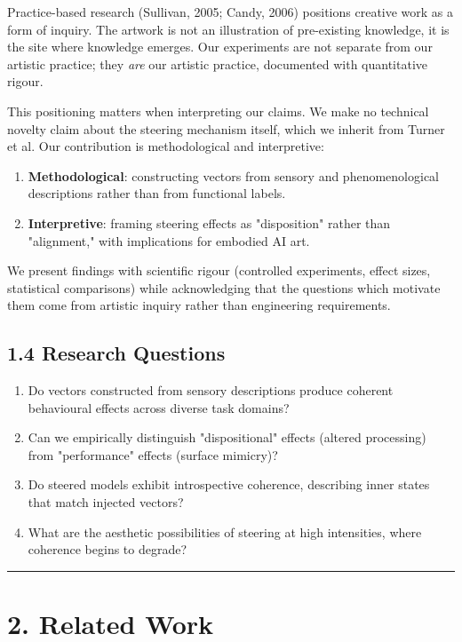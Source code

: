 \documentclass[11pt,a4paper]{article}
\begin{document}
Practice-based research (Sullivan, 2005; Candy, 2006) positions creative work as a form of inquiry. The artwork is not an illustration of pre-existing knowledge, it is the site where knowledge emerges. Our experiments are not separate from our artistic practice; they \emph{are} our artistic practice, documented with quantitative rigour.

This positioning matters when interpreting our claims. We make no technical novelty claim about the steering mechanism itself, which we inherit from Turner et al. Our contribution is methodological and interpretive:

\begin{enumerate}[leftmargin=*]
  \item \textbf{Methodological}: constructing vectors from sensory and phenomenological descriptions rather than from functional labels.
  \item \textbf{Interpretive}: framing steering effects as "disposition" rather than "alignment," with implications for embodied AI art.
\end{enumerate}

We present findings with scientific rigour (controlled experiments, effect sizes, statistical comparisons) while acknowledging that the questions which motivate them come from artistic inquiry rather than engineering requirements.

\subsection*{1.4 Research Questions}

\begin{enumerate}[leftmargin=*]
  \item Do vectors constructed from sensory descriptions produce coherent behavioural effects across diverse task domains?
  \item Can we empirically distinguish "dispositional" effects (altered processing) from "performance" effects (surface mimicry)?
  \item Do steered models exhibit introspective coherence, describing inner states that match injected vectors?
  \item What are the aesthetic possibilities of steering at high intensities, where coherence begins to degrade?
\end{enumerate}

\bigskip\hrule\bigskip

\section*{2. Related Work}
\end{document}
